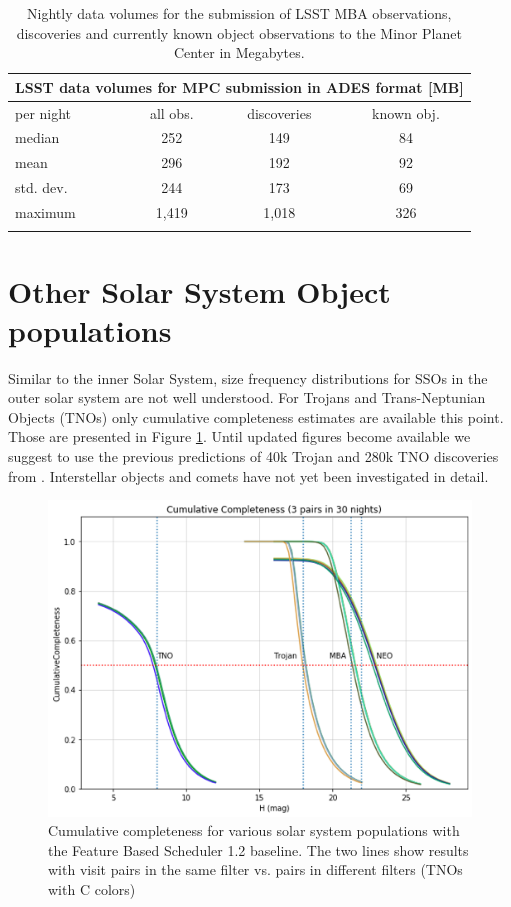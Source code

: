 \begin{table}[tb!]
\begin{center}
\begin{tabular}{lccc}
\multicolumn{4}{c}{LSST data volumes for MPC submission in ADES format [MB]}\\
\hline\hline
per night & all obs. & discoveries & known obj. \\\hline
median  & 252 &149  &84  \\
mean & 296 & 192 & 92   \\
std. dev. & 244 & 173& 69 \\
maximum & 1,419 & 1,018 & 326 \\
\hline\hline\\
\end{tabular}
\end{center}
\caption{Nightly data volumes for the submission of LSST MBA observations, discoveries and currently known object observations to the Minor Planet Center in Megabytes.}
\label{tab:data_stats}
\end{table}

\section{Other Solar System Object populations}\label{sec:other}
Similar to the inner Solar System, size frequency distributions for SSOs in the outer solar system are not well understood. 
For Trojans and Trans-Neptunian Objects (TNOs) only cumulative completeness estimates are available this point. Those are presented in Figure \ref{fig:allcum}.
Until updated figures become available we suggest to use the previous predictions of 40k Trojan and 280k TNO discoveries from \citet{jones2015asteroid}.
Interstellar objects and comets have not yet been investigated in detail.

\begin{figure}[tb!]
\begin{center}
\includegraphics[width=0.60\linewidth]{figs/allcum.png}
\end{center}
\caption{Cumulative completeness for various solar system populations with the Feature Based Scheduler 1.2 baseline.
The two lines show results with visit pairs in the same filter vs. pairs in different filters (TNOs with C colors)}
\label{fig:allcum}       %
\end{figure}


